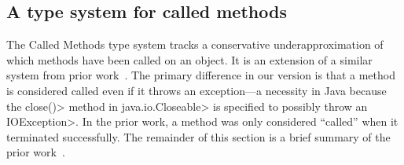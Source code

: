 


\subsection{A type system for called methods}
\label{sec:called-methods}


The Called Methods type system tracks a conservative underapproximation of which methods have been called on an object.
It is an extension of a similar system
from prior work~\cite{KelloggRSSE2020}.  The primary difference in our
version is that a method is considered called even if it throws an
exception---a necessity in Java because the \<close()> method
in \<java.io.Closeable> is specified to possibly throw an \<IOException>.
In the prior work, a method was only considered ``called'' when it terminated
successfully.
The remainder of this section is a brief summary
of the prior work~\cite{KelloggRSSE2020}.


